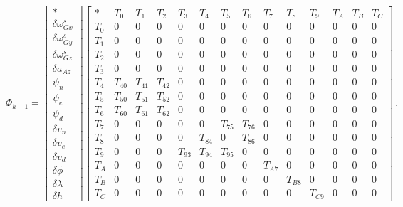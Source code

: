 \documentclass[journal]{IEEEtran}
\begin{document}
\begin{figure}[t]
\begin{equation}\label{eq_transition}
\Phi_{k-1}=
    \begin{bmatrix}
    *\\
    \delta\omega_{Gx}^s\\
    \delta\omega_{Gy}^s\\ \delta\omega_{Gz}^s\\
    \delta{a}_{Az}\\
    {\psi}_n\\
    {\psi}_e\\
    {\psi}_d\\
    \delta v_n\\
    \delta v_e\\
    \delta v_d\\
    \delta\phi\\
    \delta\lambda\\
    \delta h
    \end{bmatrix}
    \begin{bmatrix}
    *   & T_0 &T_1&T_2&T_3&T_4&T_5&T_6&T_7&T_8&T_9&T_A&T_B&T_C\\
    T_0 & 0   & 0 & 0 & 0 & 0 & 0 & 0 & 0 & 0 & 0 & 0 & 0 & 0\\
    T_1 &0    &0  &0  &0  &0  &0  &0  &0  &0  &0  &0  &  0& 0\\ T_2&0&0&0&0&0&0&0&0&0&0&0&0&0\\
    T_3&0&0&0&0&0&0&0&0&0&0&0&0&0\\
    T_4&T_{40}&T_{41}&T_{42}&0&0&0&0&0&0&0&0&0&0\\
    T_5&T_{50}&T_{51}&T_{52}&0&0&0&0&0&0&0&0&0&0\\
    T_6&T_{60}&T_{61}&T_{62}&0&0&0&0&0&0&0&0&0&0\\
    T_7&0&0&0&0&0&T_{75}&T_{76}&0&0&0&0&0&0\\
    T_8&0&0&0&0&T_{84}&0&T_{86}&0&0&0&0&0&0\\
    T_9&0&0&0&T_{93}&T_{94}&T_{95}&0&0&0&0&0&0&0\\
    T_A&0&0&0&0&0&0&0&T_{A7}&0&0&0&0&0\\
    T_B&0&0&0&0&0&0&0&0&T_{B8}&0&0&0&0\\
    T_C&0&0&0&0&0&0&0&0&0&T_{C9}&0&0&0
    \end{bmatrix}\,.
  \end{equation}
\end{figure}
\end{document}
